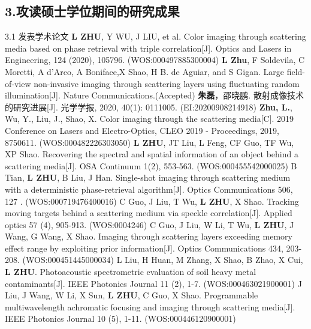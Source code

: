\begin{resume}
\section*{3.\hspace{0.75em}攻读硕士学位期间的研究成果}
\begin{resumelist}{\hspace{-0.25em}3.1\hspace{0.5em} 发表学术论文}
\resumelistitem \textbf{L ZHU}, Y WU, J LIU, et al. Color imaging through scattering media based on phase retrieval with triple correlation[J]. Optics and Lasers in Engineering, 124 (2020), 105796. (WOS:000497885300004)
\resumelistitem \textbf{L Zhu}, F Soldevila, C Moretti, A d'Arco, A Boniface,X Shao, H B. de Aguiar, and S Gigan. Large field-of-view non-invasive imaging through scattering layers using fluctuating random illumination[J]. Nature Communications.(Accepted)
\resumelistitem \textbf{朱磊}，邵晓鹏. 散射成像技术的研究进展[J]. 光学学报, 2020, 40(1): 0111005. (EI:20200908214918)
\resumelistitem \textbf{Zhu, L.}, Wu, Y., Liu, J., Shao, X. Color imaging through the scattering media[C]. 2019 Conference on Lasers and Electro-Optics, CLEO 2019 - Proceedings, 2019, 8750611. (WOS:000482226303050)
\resumelistitem \textbf{L ZHU}, JT Liu, L Feng, CF Guo, TF Wu, XP Shao. Recovering the spectral and spatial information of an object behind a scattering media[J]. OSA Continuum 1(2), 553-563. (WOS:000455542000025)
\resumelistitem B Tian, \textbf{L ZHU}, B Liu, J Han. Single-shot imaging through scattering medium with a deterministic phase-retrieval algorithm[J]. Optics Communications 506, 127 . (WOS:000719476400016)
\resumelistitem C Guo, J Liu, T Wu, \textbf{L ZHU}, X Shao. Tracking moving targets behind a scattering medium via speckle correlation[J]. Applied optics 57 (4), 905-913. (WOS:0004246)
\resumelistitem C Guo, J Liu, W Li, T Wu, \textbf{L ZHU}, J Wang, G Wang, X Shao. Imaging through scattering layers exceeding memory effect range by exploiting prior information[J]. Optics Communications 434, 203-208. (WOS:000451445000034)
\resumelistitem L Liu, H Huan, M Zhang, X Shao, B Zhao, X Cui, \textbf{L ZHU}. Photoacoustic spectrometric evaluation of soil heavy metal contaminants[J]. IEEE Photonics Journal 11 (2), 1-7. (WOS:000463021900001)
\resumelistitem J Liu, J Wang, W Li, X Sun, \textbf{L ZHU}, C Guo, X Shao. Programmable multiwavelength achromatic focusing and imaging through scattering media[J]. IEEE Photonics Journal 10 (5), 1-11. (WOS:000446120900001)
\end{resumelist}


\end{resume}

